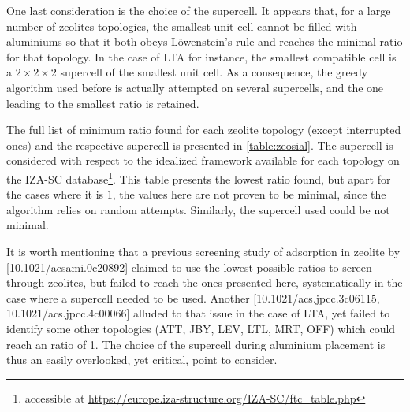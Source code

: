 \documentclass[main.tex]{subfiles}
\begin{document}
One last consideration is the choice of the supercell. It appears that, for a large number of zeolites topologies, the smallest unit cell cannot be filled with aluminiums so that it both obeys L\"owenstein's rule and reaches the minimal \SiAl ratio for that topology. In the case of LTA for instance, the smallest compatible cell is a $2\times2\times2$ supercell of the smallest unit cell. As a consequence, the greedy algorithm used before is actually attempted on several supercells, and the one leading to the smallest \SiAl ratio is retained.

The full list of minimum \SiAl ratio found for each zeolite topology (except interrupted ones) and the respective supercell is presented in \cref{table:zeosial}. The supercell is considered with respect to the idealized framework available for each topology on the IZA-SC database\footnote{accessible at \url{https://europe.iza-structure.org/IZA-SC/ftc_table.php}}. This table presents the lowest \SiAl ratio found, but apart for the cases where it is $1$, the values here are not proven to be minimal, since the algorithm relies on random attempts. Similarly, the supercell used could be not minimal.

It is worth mentioning that a previous screening study of adsorption in zeolite by [10.1021/acsami.0c20892] claimed to use the lowest possible \SiAl ratios to screen through zeolites, but failed to reach the ones presented here, systematically in the case where a supercell needed to be used. Another [10.1021/acs.jpcc.3c06115, 10.1021/acs.jpcc.4c00066] alluded to that issue in the case of LTA, yet failed to identify some other topologies (ATT, JBY, LEV, LTL, MRT, OFF) which could reach an \SiAl ratio of 1. The choice of the supercell during aluminium placement is thus an easily overlooked, yet critical, point to consider.
\end{document}
